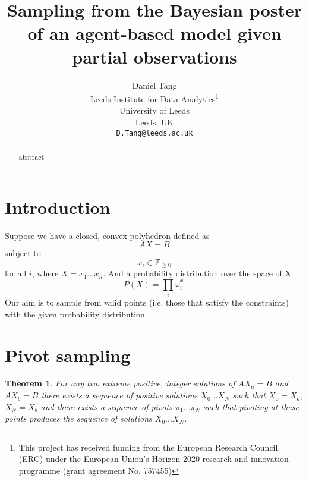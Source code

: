 \documentclass{article}
\title{Sampling from the Bayesian poster of an agent-based model given partial observations}
\author{
  Daniel Tang\\
  Leeds Institute for Data Analytics\thanks{This project has received funding from the European Research Council (ERC) under the European Union’s Horizon 2020 research and innovation programme (grant agreement No. 757455)}\\
  University of Leeds\\
  Leeds, UK\\
  \texttt{D.Tang@leeds.ac.uk} \\
}
\newtheorem{theorem}{Theorem}
\begin{document}
\maketitle

\begin{abstract}
abstract
\end{abstract}


\section{Introduction}

Suppose we have a closed, convex polyhedron defined as
\begin{equation}
AX = B
\label{polyhedron}
\end{equation}
subject to
\[
x_i \in \mathbb{Z}_{\ge 0}
\]
for all $i$, where $X = x_1...x_n$. And a probability distribution over the space of X
\begin{equation}
P(X) = \prod_i \omega_i^{x_i}
\label{probability}
\end{equation}
Our aim is to sample from valid points (i.e. those that satisfy the constraints) with the given probability distribution.

\section{Pivot sampling}

\begin{theorem}
For any two extreme positive, integer solutions of $AX_a = B$ and $AX_b = B$ there exists a sequence of positive solutions $X_0...X_N$ such that $X_0 = X_a$, $X_N = X_b$ and there exists a sequence of pivots $\pi_1...\pi_N$ such that pivoting at these points produces the sequence of solutions $X_0...X_N$.
\end{theorem}
\end{document}
